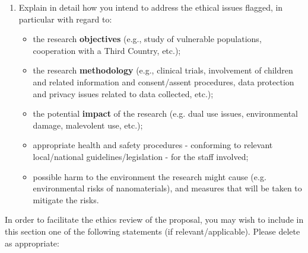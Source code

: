 \bigskip
{\bf 
\begin{enumerate}[leftmargin=*, label=\arabic*), start=2]
  \item Explain in detail how you intend to address the ethical issues flagged, in particular with regard to: 
  \begin{itemize}
    \item {\normalfont the research {\bf objectives} (e.g., study of vulnerable 
    populations, cooperation with a Third Country, etc.);}
    \item {\normalfont the research {\bf methodology} (e.g., clinical trials, 
    involvement of children and related information and consent/assent procedures, data protection and privacy issues related to data collected, etc.);}
    \item {\normalfont the potential {\bf impact} of the research (e.g. dual use issues,
    environmental damage, malevolent use, etc.);}
    \item {\normalfont appropriate health and safety procedures - conforming to relevant
    local/national guidelines/legislation - for the staff involved;}
    \item {\normalfont  possible harm to the environment the research might cause
    (e.g. environmental risks of nanomaterials), and measures that will be taken to mitigate the risks.}
  \end{itemize}
\end{enumerate}
}

\noindent
In order to facilitate the ethics review of the proposal, you may wish to include in this section
one of the following statements (if relevant/applicable). Please delete as appropriate:

